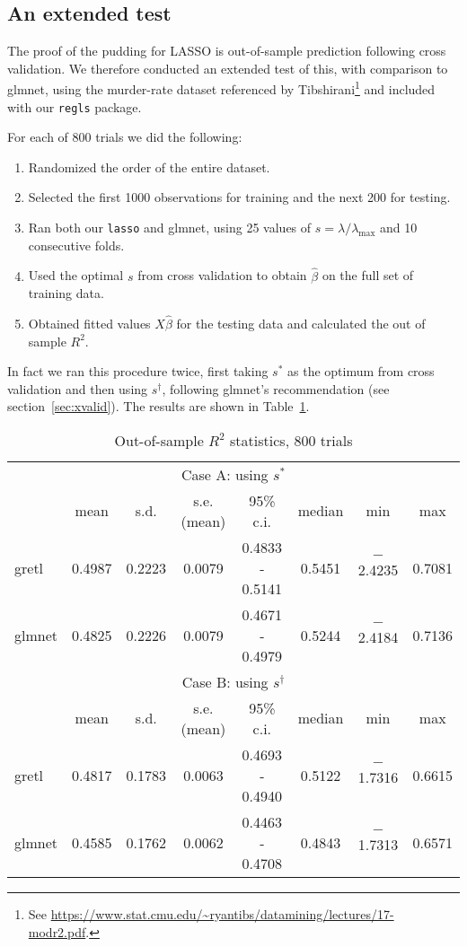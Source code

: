 \documentclass{article}
\begin{document}
\subsection*{An extended test}

The proof of the pudding for LASSO is out-of-sample prediction
following cross validation. We therefore conducted an extended test of
this, with comparison to \textsf{glmnet}, using the murder-rate
dataset referenced by Tibshirani\footnote{See
  \url{https://www.stat.cmu.edu/~ryantibs/datamining/lectures/17-modr2.pdf}.}
and included with our \texttt{regls} package.

For each of 800 trials we did the following:
\begin{enumerate}
\item Randomized the order of the entire dataset.
\item Selected the first 1000 observations for training and the next
  200 for testing.
\item Ran both our \texttt{lasso} and \textsf{glmnet}, using 25 values
  of $s = \lambda/\lambda_{\max}$ and 10 consecutive folds.
\item Used the optimal $s$ from cross validation to obtain
  $\hat{\beta}$ on the full set of training data.
\item Obtained fitted values $X\hat{\beta}$ for the testing data and
  calculated the out of sample $R^2$.
\end{enumerate}

In fact we ran this procedure twice, first taking $s^*$ as the optimum
from cross validation and then using $s^{\dagger}$, following
\textsf{glmnet}'s recommendation (see section~\ref{sec:xvalid}). The
results are shown in Table~\ref{tab:bigtest}.

\begin{table}[htbp]
  \centering
  \begin{tabular}{lccccccc}
    \multicolumn{8}{c}{Case A: using $s^*$} \\
 & mean & s.d. & s.e.(mean) & 95\% c.i. & median & min & max \\
\textsf{gretl} & 0.4987 & 0.2223 & 0.0079 & 0.4833 - 0.5141 & 0.5451 & $-$2.4235 & 0.7081 \\
\textsf{glmnet} & 0.4825 & 0.2226 & 0.0079 & 0.4671 - 0.4979 & 0.5244 & $-$2.4184 & 0.7136 \\[8pt]
    \multicolumn{8}{c}{Case B: using $s^{\dagger}$} \\
 & mean & s.d. & s.e.(mean) & 95\% c.i. & median & min & max \\
\textsf{gretl} & 0.4817 & 0.1783 & 0.0063 & 0.4693 - 0.4940 & 0.5122 & $-$1.7316 & 0.6615 \\
\textsf{glmnet} & 0.4585 & 0.1762 & 0.0062 & 0.4463 - 0.4708 & 0.4843 & $-$1.7313 & 0.6571 \\
  \end{tabular}
  \caption{Out-of-sample $R^2$ statistics, 800 trials}
  \label{tab:bigtest}
\end{table}
\end{document}
